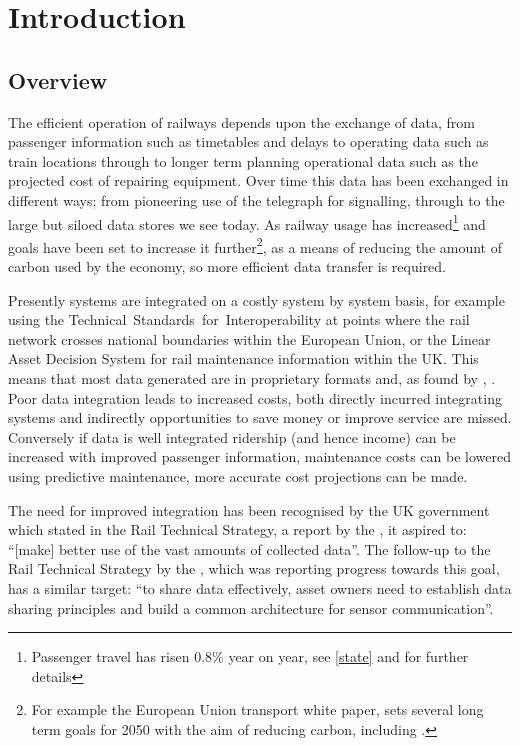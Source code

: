 \chapter{Introduction}\label{ch:intro}
\section{Overview}
The efficient operation of railways depends upon the exchange of data, from passenger information such as timetables and delays to operating data such as train locations through to longer term planning operational data such as the projected cost of repairing equipment. Over time this data has been exchanged in different ways; from pioneering use of the telegraph for signalling, through to the large but siloed data stores we see today. As railway usage has increased\footnote{Passenger travel has risen 0.8\% year on year, see \autoref{state} and \citep{OfficeofRoad&Rail2016} for further details} and goals have been set to increase it further\footnote{For example the European Union transport white paper, \citet{EC2011} sets several long term goals for 2050 with the aim of reducing carbon, including .}, as a means of reducing the amount of carbon used by the economy, so more efficient data transfer is required. 

Presently systems are integrated on a costly system by system basis, for example using the Technical~Standards~for~Interoperability at points where the rail network crosses national boundaries within the European Union, or the Linear Asset Decision System for rail maintenance information within the UK. This means that most data generated are in proprietary formats and, as found by \citet{Kopf2010}, . Poor data integration leads to increased costs, both directly incurred integrating systems and indirectly opportunities to save money or improve service are missed. Conversely if data is well integrated ridership (and hence income) can be increased with improved passenger information, maintenance costs can be lowered using predictive maintenance, more accurate cost projections can be made.

The need for improved integration has been recognised by the UK government which stated in the Rail Technical Strategy, a report by the \citet{TechnicalStrategyLeadershipGroup2012b}, it aspired to: ``[make] better use of the vast amounts of collected data''. The follow-up to the Rail Technical Strategy by the \citet{RDG2017}, which was reporting progress towards this goal, has a similar target: ``to share data effectively, asset owners need to establish data sharing principles and build a common architecture for sensor communication''.

